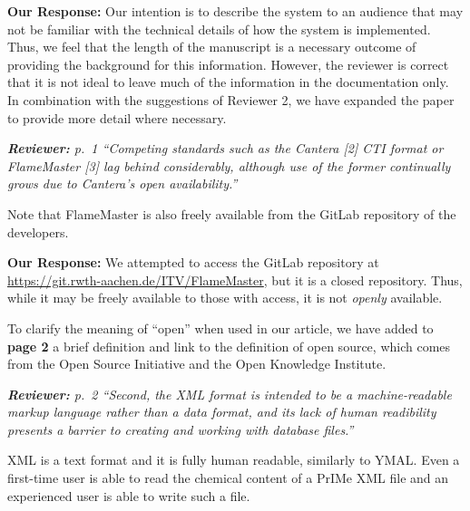 \documentclass[a4paper,10pt]{elsarticle}
\newenvironment{reviewer}{\vspace{0.5\baselineskip}\begingroup\itshape\textbf{Reviewer:}}{\endgroup}
\newenvironment{response}{\textbf{Our Response:}}{\vspace{0.5\baselineskip}}
\begin{document}
\begin{response}
    Our intention is to describe the system to an audience that may not be familiar with the
    technical details of how the system is implemented. Thus, we feel that the length of the
    manuscript is a necessary outcome of providing the background for this information. However, the
    reviewer is correct that it is not ideal to leave much of the information in the documentation
    only. In combination with the suggestions of Reviewer 2, we have expanded the paper to provide
    more detail where necessary.
\end{response}

\begin{reviewer}
    p.~1 ``Competing standards such as the Cantera [2] CTI format or FlameMaster [3] lag behind
    considerably, although use of the former continually grows due to Cantera's open availability.''

    Note that FlameMaster is also freely available from the GitLab repository of the developers.
\end{reviewer}

\begin{response}
    We attempted to access the GitLab repository at \url{https://git.rwth-aachen.de/ITV/FlameMaster}, but
    it is a closed repository. Thus, while it may be freely available to those with access, it is not
    \emph{openly} available.

    To clarify the meaning of ``open'' when used in our article, we have added to \textbf{page 2} a
    brief definition and link to the definition of open source, which comes from the
    Open Source Initiative and the Open Knowledge Institute.
\end{response}

\begin{reviewer}
    p.~2 ``Second, the XML format is intended to be a machine-readable markup language rather than a
    data format, and its lack of human readibility presents a barrier to creating and working with
    database files.''

    XML is a text format and it is fully human readable, similarly to YMAL. Even a
    first-time user is able to read the chemical content of a  PrIMe XML file and an experienced
    user is able to write such a file.
\end{reviewer}
\end{document}
